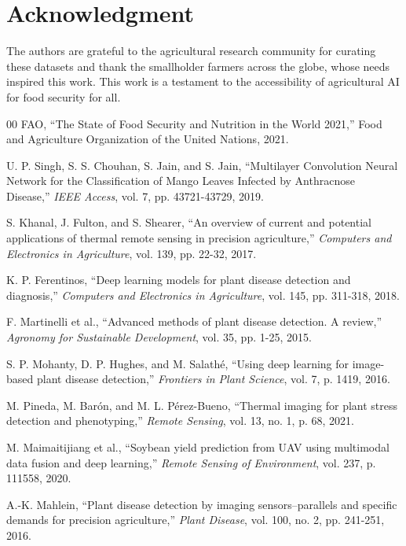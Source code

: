 \documentclass[conference]{IEEEtran}
\begin{document}
\section*{Acknowledgment}

The authors are grateful to the agricultural research community for curating these datasets and thank the smallholder farmers across the globe, whose needs inspired this work. This work is a testament to the accessibility of agricultural AI for food security for all.

\begin{thebibliography}{00}
FAO, ``The State of Food Security and Nutrition in the World 2021,'' Food and Agriculture Organization of the United Nations, 2021.

U. P. Singh, S. S. Chouhan, S. Jain, and S. Jain, ``Multilayer Convolution Neural Network for the Classification of Mango Leaves Infected by Anthracnose Disease,'' \textit{IEEE Access}, vol. 7, pp. 43721-43729, 2019.

S. Khanal, J. Fulton, and S. Shearer, ``An overview of current and potential applications of thermal remote sensing in precision agriculture,'' \textit{Computers and Electronics in Agriculture}, vol. 139, pp. 22-32, 2017.

K. P. Ferentinos, ``Deep learning models for plant disease detection and diagnosis,'' \textit{Computers and Electronics in Agriculture}, vol. 145, pp. 311-318, 2018.

F. Martinelli et al., ``Advanced methods of plant disease detection. A review,'' \textit{Agronomy for Sustainable Development}, vol. 35, pp. 1-25, 2015.

S. P. Mohanty, D. P. Hughes, and M. Salathé, ``Using deep learning for image-based plant disease detection,'' \textit{Frontiers in Plant Science}, vol. 7, p. 1419, 2016.

M. Pineda, M. Barón, and M. L. Pérez-Bueno, ``Thermal imaging for plant stress detection and phenotyping,'' \textit{Remote Sensing}, vol. 13, no. 1, p. 68, 2021.

M. Maimaitijiang et al., ``Soybean yield prediction from UAV using multimodal data fusion and deep learning,'' \textit{Remote Sensing of Environment}, vol. 237, p. 111558, 2020.

A.-K. Mahlein, ``Plant disease detection by imaging sensors--parallels and specific demands for precision agriculture,'' \textit{Plant Disease}, vol. 100, no. 2, pp. 241-251, 2016.


\end{thebibliography}
\end{document}
